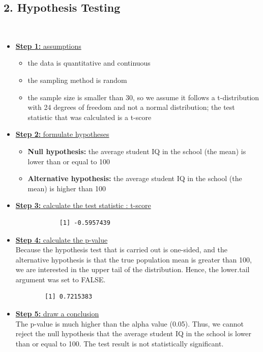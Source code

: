 \documentclass[12pt,letterpaper]{article}
\begin{document}
\subsection*{2. Hypothesis Testing}\\
\vspace{.5cm}
\begin{itemize}
	\item \underline{\textbf{Step 1:} assumptions}\\
	\begin{itemize}
		\item the data is quantitative and continuous 
		\item the sampling method is random
		\item the sample size is smaller than 30, so we assume it follows a t-distribution with 24 degrees of freedom and not a normal distribution; the test statistic that was calculated is a t-score 
	\end{itemize}
	\item \underline{\textbf{Step 2:} formulate hypotheses}\\
	\begin{itemize}
		\item \textbf{Null hypothesis:} the average student IQ in the school (the mean) is lower than or equal to 100 
		\item \textbf{Alternative hypothesis:} the average student IQ in the school (the mean) is higher than 100 
	\end{itemize}
	\item \underline{\textbf{Step 3: } calculate the test statistic : t-score}\\
		 
		\begin{verbatim}
			[1] -0.5957439
		\end{verbatim}
\newpage
	\item \underline{\textbf{Step 4:} calculate the p-value}\\[0.5cm]
	Because the hypothesis test that is carried out is one-sided, and the alternative hypothesis is that the true population mean is greater than 100, we are interested in the upper tail of the distribution. Hence, the lower.tail argument was set to FALSE.
 
	\begin{verbatim}
		[1] 0.7215383
	\end{verbatim}
	\item\underline{\textbf{Step 5:} draw a conclusion}\\[0.5cm]
	The p-value is much higher than the alpha value (0.05). Thus, we cannot reject the null hypothesis that the average student IQ in the school is lower than or equal to 100. The test result is not statistically significant. 
\end{itemize}
\end{document}
